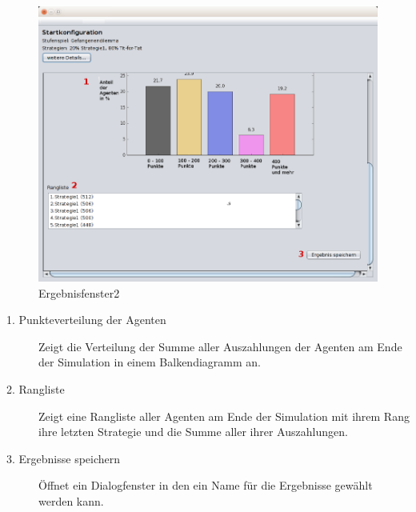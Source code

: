 \pagebreak

\begin{figure}[hp] 
  \centering
     \includegraphics[width=1.1\textwidth]{GUI_Entwurf/Ergebnisfenster2.png}
  \caption{Ergebnisfenster2}
  \label{fig:Bild8}
\end{figure}

\begin{description}

\item[1. Punkteverteilung der Agenten] Zeigt die Verteilung der Summe aller Auszahlungen der Agenten am Ende der Simulation in einem Balkendiagramm an.

\item[2. Rangliste] Zeigt eine Rangliste aller Agenten am Ende der Simulation mit ihrem Rang ihre letzten Strategie und die Summe aller ihrer Auszahlungen.

\item[3. Ergebnisse speichern] Öffnet ein Dialogfenster in den ein Name für die Ergebnisse gewählt werden kann.


\end{description}

